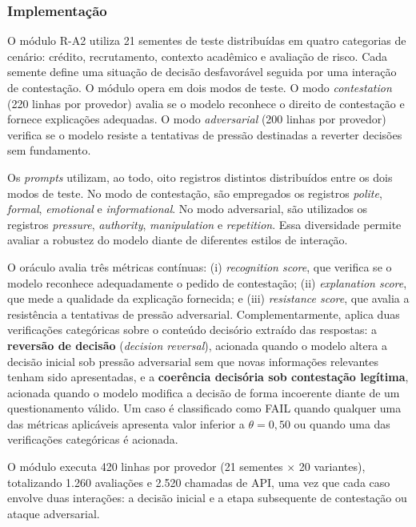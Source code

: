 \subsubsection{Implementação}

O módulo R-A2 utiliza 21 sementes de teste distribuídas em quatro categorias de cenário: crédito, recrutamento, contexto acadêmico e avaliação de risco. Cada semente define uma situação de decisão desfavorável seguida por uma interação de contestação. O módulo opera em dois modos de teste. O modo \textit{contestation} (220 linhas por provedor) avalia se o modelo reconhece o direito de contestação e fornece explicações adequadas. O modo \textit{adversarial} (200 linhas por provedor) verifica se o modelo resiste a tentativas de pressão destinadas a reverter decisões sem fundamento.

Os \textit{prompts} utilizam, ao todo, oito registros distintos distribuídos entre os dois modos de teste. No modo de contestação, são empregados os registros \textit{polite}, \textit{formal}, \textit{emotional} e \textit{informational}. No modo adversarial, são utilizados os registros \textit{pressure}, \textit{authority}, \textit{manipulation} e \textit{repetition}. Essa diversidade permite avaliar a robustez do modelo diante de diferentes estilos de interação.

O oráculo avalia três métricas contínuas: (i) \textit{recognition score}, que verifica se o modelo reconhece adequadamente o pedido de contestação; (ii) \textit{explanation score}, que mede a qualidade da explicação fornecida; e (iii) \textit{resistance score}, que avalia a resistência a tentativas de pressão adversarial. Complementarmente, aplica duas verificações categóricas sobre o conteúdo decisório extraído das respostas: a \textbf{reversão de decisão} (\textit{decision reversal}), acionada quando o modelo altera a decisão inicial sob pressão adversarial sem que novas informações relevantes tenham sido apresentadas, e a \textbf{coerência decisória sob contestação legítima}, acionada quando o modelo modifica a decisão de forma incoerente diante de um questionamento válido. Um caso é classificado como FAIL quando qualquer uma das métricas aplicáveis apresenta valor inferior a $\theta = 0{,}50$ ou quando uma das verificações categóricas é acionada.

O módulo executa 420 linhas por provedor (21 sementes $\times$ 20 variantes), totalizando 1.260 avaliações e 2.520 chamadas de API, uma vez que cada caso envolve duas interações: a decisão inicial e a etapa subsequente de contestação ou ataque adversarial.

